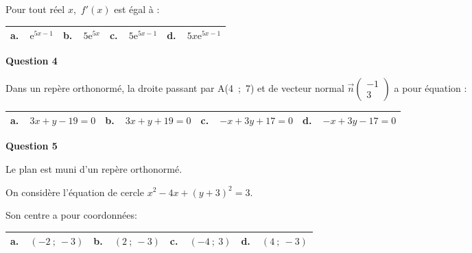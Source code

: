 \documentclass[10pt]{article}
\providecommand{\vect}[1]{\overrightarrow{#1}}
\begin{document}
Pour tout réel $x$, \,$f' (x)$ est égal à :

\begin{center}
\begin{tabularx}{\linewidth}{|*{4}{X|}}\hline
\textbf{a.~~}$\text{e}^{5x- 1}$&\textbf{b.~~}$5\text{e}^{5x}$&\textbf{c.~~}$5\text{e}^{5x-1}$&\textbf{d.~~}$5x\text{e}^{5x- 1}$\\ \hline
\end{tabularx}
\end{center}

\medskip

\textbf{Question 4}

Dans un repère orthonormé, la droite passant par A(4~;~7) et de vecteur normal
$\vect{n}\begin{pmatrix}-1\\3\end{pmatrix}$ a pour équation :

\begin{center}
\begin{tabularx}{\linewidth}{|*{4}{X|}}\hline
\textbf{a.~~}$3x + y - 19 = 0$& \textbf{b.~~}$3x + y+ 19 = 0 $&\textbf{c.~~}$-x + 3y+ 17 = 0$&\textbf{d.~~}$-x + 3y- 17 = 0$\\ \hline
\end{tabularx}
\end{center}

\medskip

\textbf{Question 5}

Le plan est muni d'un repère orthonormé.

On considère l'équation de cercle $x^2 - 4x + (y + 3)^2 = 3$. 

Son centre a pour coordonnées: 

\begin{center}
\begin{tabularx}{\linewidth}{|*{4}{X|}}\hline
\textbf{a.~~}$(-2~;~-3)$& \textbf{b.~~}$(2~;~-3)$&\textbf{c.~~}$(-4~;~3)$&\textbf{d.~~}$(4~;~-3)$\\ \hline
\end{tabularx}
\end{center}

\bigskip
\end{document}
